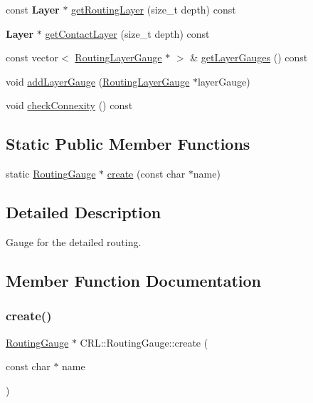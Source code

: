 \begin{DoxyCompactItemize}
const \textbf{ Layer} $\ast$ \hyperlink{classCRL_1_1RoutingGauge_a6d6c1951c8728886d3fb702891685b94}{get\+Routing\+Layer} (size\+\_\+t depth) const
\item 
\textbf{ Layer} $\ast$ \hyperlink{classCRL_1_1RoutingGauge_a4b603c0fd5f21db1c93d8a747ec1f4ba}{get\+Contact\+Layer} (size\+\_\+t depth) const
\item 
const vector$<$ \hyperlink{classCRL_1_1RoutingLayerGauge}{Routing\+Layer\+Gauge} $\ast$ $>$ \& \hyperlink{classCRL_1_1RoutingGauge_ae8cebef061519fb2df94e3a9dcf09e6e}{get\+Layer\+Gauges} () const
\item 
void \hyperlink{classCRL_1_1RoutingGauge_a32313fbc68080e0b7e03b3e06dc1d9c5}{add\+Layer\+Gauge} (\hyperlink{classCRL_1_1RoutingLayerGauge}{Routing\+Layer\+Gauge} $\ast$layer\+Gauge)
\item 
void \hyperlink{classCRL_1_1RoutingGauge_ae76259fdd9d27d1127ac201c41ab8c20}{check\+Connexity} () const
\end{DoxyCompactItemize}
\subsection*{Static Public Member Functions}
\begin{DoxyCompactItemize}
\item 
static \hyperlink{classCRL_1_1RoutingGauge}{Routing\+Gauge} $\ast$ \hyperlink{classCRL_1_1RoutingGauge_a7258273728f5db47e422d5914c1c36bd}{create} (const char $\ast$name)
\end{DoxyCompactItemize}


\subsection{Detailed Description}
Gauge for the detailed routing. 

\subsection{Member Function Documentation}
\mbox{\label{classCRL_1_1RoutingGauge_a7258273728f5db47e422d5914c1c36bd}} 
\subsubsection{\texorpdfstring{create()}{create()}}
{\footnotesize\ttfamily \hyperlink{classCRL_1_1RoutingGauge}{Routing\+Gauge} $\ast$ C\+R\+L\+::\+Routing\+Gauge\+::create (\begin{DoxyParamCaption}\item[{const char $\ast$}]{name }\end{DoxyParamCaption})\hspace{0.3cm}{\ttfamily [static]}}

